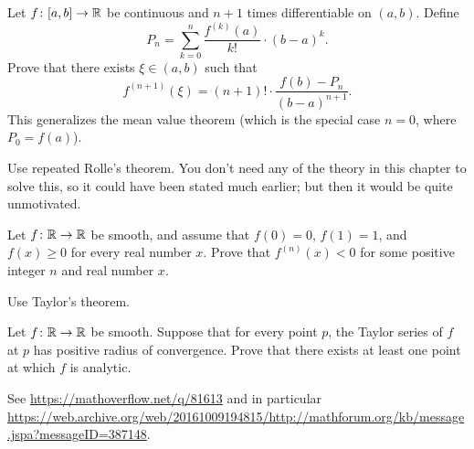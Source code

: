 \begin{dproblem}
	Let $f \colon [a,b] \to \mathbb R$ be continuous
	and $n+1$ times differentiable on $(a,b)$.
	Define
	\[ P_n = \sum_{k=0}^n \frac{f^{(k)}(a)}{k!} \cdot (b-a)^k. \]
	Prove that there exists $\xi \in (a,b)$ such that
	\[ f^{(n+1)}(\xi) = (n+1)! \cdot \frac{f(b) - P_n}{(b-a)^{n+1}}. \]
	This generalizes the mean value theorem
	(which is the special case $n = 0$, where $P_0 = f(a)$).
	\begin{hint}
		Use repeated Rolle's theorem.
		You don't need any of the theory in this chapter to solve this,
		so it could have been stated much earlier;
		but then it would be quite unmotivated.
	\end{hint}
\end{dproblem}

\begin{problem}
	[Putnam 2018 A5]
	\twochili
	Let $f \colon \mathbb R \to \mathbb R$ be smooth,
	and assume that $f(0) = 0$, $f(1) = 1$, and $f(x) \ge 0$
	for every real number $x$.
	Prove that $f^{(n)}(x) < 0$ for some positive integer $n$
	and real number $x$.
	\begin{hint}
		Use Taylor's theorem.
	\end{hint}
\end{problem}

\begin{problem}
	\threechili
	Let $f \colon \mathbb R \to \mathbb R$ be smooth.
	Suppose that for every point $p$,
	the Taylor series of $f$ at $p$ has positive radius of convergence.
	Prove that there exists at least one point at which $f$ is analytic.
	\begin{sol}
		See \url{https://mathoverflow.net/q/81613}
		and in particular
		\url{https://web.archive.org/web/20161009194815/http://mathforum.org/kb/message.jspa?messageID=387148}.
	\end{sol}
\end{problem}
